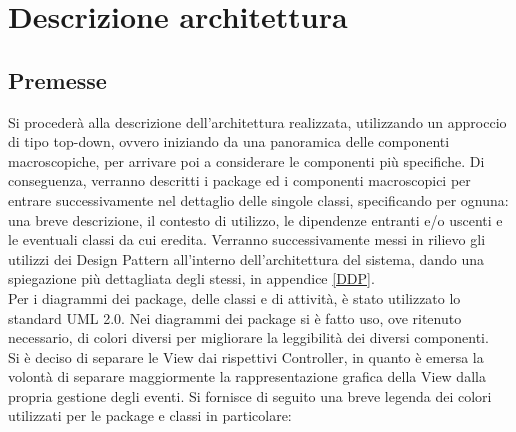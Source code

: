 \section{Descrizione architettura}
\label{descrizione_architettura}

\subsection{Premesse}
Si procederà alla descrizione dell'architettura realizzata, utilizzando un approccio di tipo top-down, ovvero iniziando da una panoramica delle componenti macroscopiche, per arrivare poi a considerare le componenti più specifiche. Di conseguenza, verranno descritti i package\glossario{} ed i componenti macroscopici per entrare successivamente nel dettaglio delle singole classi, specificando per ognuna: una breve descrizione, il contesto di utilizzo, le dipendenze entranti e/o uscenti e le eventuali classi da cui eredita.
Verranno successivamente messi in rilievo gli utilizzi dei Design Pattern\glossario{} all'interno dell'architettura del sistema, dando una spiegazione più dettagliata degli stessi, in appendice \ref{DDP}.\\
Per i diagrammi dei package\glossario{}, delle classi e di attività, è stato utilizzato lo standard UML\glossario{} 2.0. Nei diagrammi dei package\glossario{} si è fatto uso, ove ritenuto necessario, di colori diversi per migliorare la leggibilità dei diversi componenti.\\
Si è deciso di separare le View dai rispettivi Controller, in quanto è emersa la volontà di separare maggiormente la rappresentazione grafica della View dalla propria gestione degli eventi.
Si fornisce di seguito una breve legenda dei colori utilizzati per le package\glossario{} e classi in particolare:
